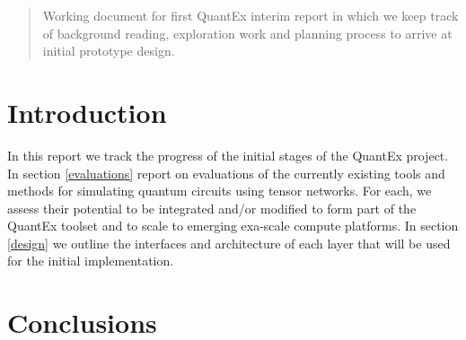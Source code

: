 \documentclass[12pt]{article}
\begin{document}
\maketitle

\begin{abstract}
Working document for first QuantEx interim report in which we keep track of
background reading, exploration work and planning process to arrive at initial
prototype design.
\end{abstract}

\section{Introduction}
In this report we track the progress of the initial stages of the QuantEx project. In section \ref{evaluations} report on evaluations of the currently existing tools and methods for simulating quantum circuits using tensor networks. For each, we assess their potential to be integrated and/or modified to form part of the QuantEx toolset and to scale to emerging exa-scale compute platforms. In section \ref{design} we outline the interfaces and architecture of each layer that will be used for the initial implementation.





\section{Conclusions}\label{conclusions}



\end{document}
